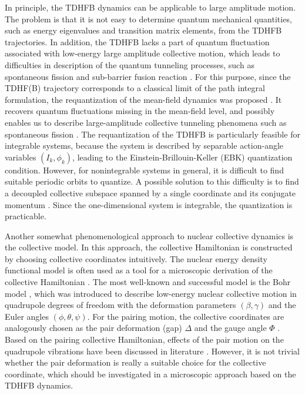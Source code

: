 \documentclass[%
superscriptaddress,
preprint,
showpacs,
nofootinbib,
amsmath,amssymb,
aps,
prc,
floatfix ]%
{revtex4-1}
\begin{document}
In principle, the TDHFB dynamics can be applicable to large amplitude motion.
The problem is that it is not easy to determine quantum mechanical 
quantities, such as energy eigenvalues and transition matrix elements,
from the TDHFB trajectories.
In addition, the TDHFB lacks a part of quantum fluctuation
associated with low-energy
large amplitude collective motion,
which leads to difficulties in description of the quantum tunneling
processes, such as spontaneous fission and sub-barrier fusion reaction \cite{S12}.
For this purpose,
since the TDHF(B) trajectory corresponds to a classical limit of the path
integral formulation,
the requantization of the mean-field dynamics was
proposed \cite{Neg82,L80,LNP80,KS80,K81,Rei80}.
It recovers quantum fluctuations missing in the mean-field
level, and possibly enables us to describe large-amplitude collective
tunneling phenomena such as spontaneous fission \cite{Neg82}.
The requantization of the TDHFB is particularly feasible
for integrable systems, because the system is described by separable
action-angle variables $(I_k, \phi_k)$, leading to
the Einstein-Brillouin-Keller (EBK) quantization condition.
However, for nonintegrable systems in general, it is difficult to find
suitable periodic orbits to quantize.
A possible solution to this difficulty is to find a decoupled collective
subspace spanned by
a single coordinate and its conjugate momentum \cite{NMMY16}.
Since the one-dimensional system is integrable, the quantization is
practicable.

Another somewhat phenomenological approach
to nuclear collective dynamics is the collective model.
In this approach, the collective Hamiltonian is constructed by choosing
collective coordinates intuitively.
The nuclear energy density functional model is often used as a tool for
a microscopic derivation of the collective Hamiltonian \cite{NMMY16}.
The most well-known and successful model is the Bohr model \cite{BM75},
which was introduced to describe low-energy
nuclear collective motion in quadrupole degrees of freedom with
the deformation parameters $(\beta, \gamma)$ and the Euler angles
$(\phi,\theta,\psi)$.
For the pairing motion, the collective coordinates are analogously
chosen as the pair deformation (gap) $\Delta$ and the gauge angle $\Phi$
\cite{BBPK70}.
Based on the pairing collective Hamiltonian, 
effects of the pair motion on the quadrupole vibrations %
have been discussed in literature \cite{delta1,delta3}.
However, it is not trivial whether the pair deformation is really a suitable
choice for the collective coordinate,
which should be investigated in a microscopic approach based on
the TDHFB dynamics.
\end{document}
